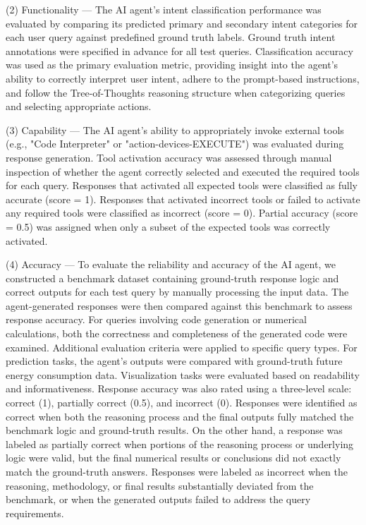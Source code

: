 \documentclass[final,3p,times]{elsarticle}
\begin{document}
(2) Functionality --- The AI agent’s intent classification performance was evaluated by comparing its predicted primary and secondary intent categories for each user query against predefined ground truth labels. Ground truth intent annotations were specified in advance for all test queries. Classification accuracy was used as the primary evaluation metric, providing insight into the agent’s ability to correctly interpret user intent, adhere to the prompt-based instructions, and follow the Tree-of-Thoughts reasoning structure when categorizing queries and selecting appropriate actions.

(3) Capability --- The AI agent’s ability to appropriately invoke external tools (e.g., "Code Interpreter" or "action-devices-EXECUTE") was evaluated during response generation. Tool activation accuracy was assessed through manual inspection of whether the agent correctly selected and executed the required tools for each query. Responses that activated all expected tools were classified as fully accurate (score = 1). Responses that activated incorrect tools or failed to activate any required tools were classified as incorrect (score = 0). Partial accuracy (score = 0.5) was assigned when only a subset of the expected tools was correctly activated.

(4) Accuracy --- To evaluate the reliability and accuracy of the AI agent, we constructed a benchmark dataset containing ground-truth response logic and correct outputs for each test query by manually processing the input data. The agent-generated responses were then compared against this benchmark to assess response accuracy. For queries involving code generation or numerical calculations, both the correctness and completeness of the generated code were examined. Additional evaluation criteria were applied to specific query types. For prediction tasks, the agent’s outputs were compared with ground-truth future energy consumption data. Visualization tasks were evaluated based on readability and informativeness. Response accuracy was also rated using a three-level scale: correct (1), partially correct (0.5), and incorrect (0). Responses were identified as correct when both the reasoning process and the final outputs fully matched the benchmark logic and ground-truth results. On the other hand, a response was labeled as partially correct when portions of the reasoning process or underlying logic were valid, but the final numerical results or conclusions did not exactly match the ground-truth answers. Responses were labeled as incorrect when the reasoning, methodology, or final results substantially deviated from the benchmark, or when the generated outputs failed to address the query requirements.
\end{document}
